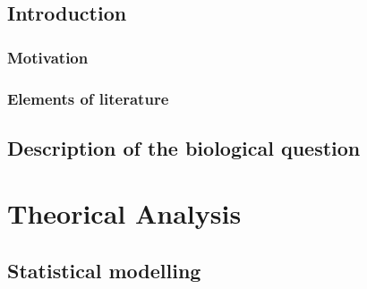 \documentclass[mainlanguage=french,fncychap=none, secnumdepth=paragraph]{yathesis}
\begin{document}



%
%
%

\maketitle[frametitle=none]

\makekeywords

\makelaboratory

\dedication{À Manue}
\dedication{À Garance}
\dedication{À mes parents}
\dedication{À Grégoire}




\makeabstract

\tableofcontents

%

\mainmatter






\chapter{Introduction}
    
\section{Motivation}
\section{Elements of literature}

\chapter{Description of the biological question}
    

\part{Theorical Analysis}
\chapter{Statistical modelling}
    
\end{document}
